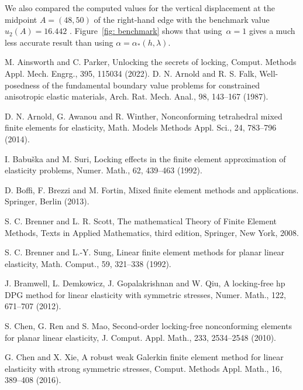 \documentclass[11pt]{article}
\numberwithin{equation}{section}
\begin{document}
 We also compared the computed values for the vertical displacement at the midpoint $A=(48,50)$ of the right-hand edge with the benchmark value 
$u_2(A)=16.442$ \cite[p.~3491]{LiuWang2022}.  Figure~\ref{fig: benchmark} shows that using~$\alpha=1$ gives a much less accurate result than using $\alpha=\alpha_*(h,\lambda)$.

\begin{thebibliography}{99.}
 M. Ainsworth and C. Parker, Unlocking the secrets of locking, Comput. Methods
Appl. Mech. Engrg., 395, 115034 (2022).
 D. N.  Arnold and R. S.  Falk,  Well-posedness of the fundamental boundary value problems for constrained anisotropic elastic materials, Arch. Rat. Mech. Anal., 98, 143--167 (1987). 

 D. N. Arnold, G. Awanou and  R. Winther, Nonconforming tetrahedral mixed finite elements for elasticity, Math. Models Methods Appl. Sci., 24, 783--796 (2014).

  I. Babuška and M. Suri, Locking effects in the finite element approximation of elasticity
problems, Numer. Math., 62, 439--463 (1992).

 D. Boffi, F. Brezzi and  M. Fortin, Mixed finite element methods and applications. Springer, Berlin (2013).

 S. C. Brenner and L. R. Scott, The mathematical Theory of Finite Element Methods, Texts in Applied Mathematics, third edition, Springer, New York, 2008.

 S. C. Brenner and  L.-Y. Sung, Linear finite element methods for planar linear elasticity, Math. Comput., 59, 321--338 (1992).

 J. Bramwell, L. Demkowicz, J. Gopalakrishnan and  W. Qiu, A locking-free hp DPG method for linear elasticity with symmetric stresses, Numer. Math., 122, 671--707 (2012). 

 S. Chen, G. Ren and  S. Mao, Second-order locking-free nonconforming elements for planar linear elasticity, J. Comput. Appl. Math., 233, 2534--2548 (2010).

 G. Chen and  X. Xie, A robust weak Galerkin finite element method for linear elasticity with strong symmetric stresses, Comput. Methods Appl. Math., 16, 389--408 (2016).


\end{thebibliography}
\end{document}
